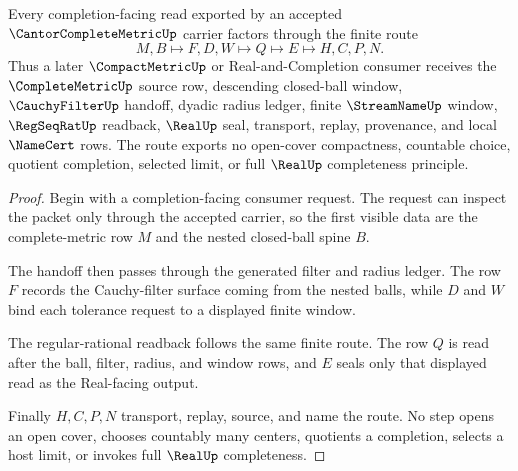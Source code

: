 \begin{theorem}
\label{thm:cantor-complete-metric-nested-ball-handoff}
Every completion-facing read exported by an accepted $\CantorCompleteMetricUp$ carrier factors through the finite route
$$
M,B \longmapsto F,D,W \longmapsto Q \longmapsto E \longmapsto H,C,P,N .
$$
Thus a later $\CompactMetricUp$ or Real-and-Completion consumer receives the $\CompleteMetricUp$ source row, descending closed-ball window, $\CauchyFilterUp$ handoff, dyadic radius ledger, finite $\StreamNameUp$ window, $\RegSeqRatUp$ readback, $\RealUp$ seal, transport, replay, provenance, and local $\NameCert$ rows. The route exports no open-cover compactness, countable choice, quotient completion, selected limit, or full $\RealUp$ completeness principle.
\end{theorem}
\begin{proof}
Begin with a completion-facing consumer request. The request can inspect the packet only through the accepted carrier, so the first visible data are the complete-metric row $M$ and the nested closed-ball spine $B$.

The handoff then passes through the generated filter and radius ledger. The row $F$ records the Cauchy-filter surface coming from the nested balls, while $D$ and $W$ bind each tolerance request to a displayed finite window.

The regular-rational readback follows the same finite route. The row $Q$ is read after the ball, filter, radius, and window rows, and $E$ seals only that displayed read as the Real-facing output.

Finally $H,C,P,N$ transport, replay, source, and name the route. No step opens an open cover, chooses countably many centers, quotients a completion, selects a host limit, or invokes full $\RealUp$ completeness.
\end{proof}



